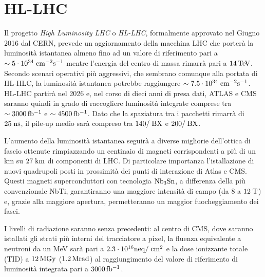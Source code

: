 \section{HL-LHC}
Il progetto {\em High Luminosity LHC} o {\em HL-LHC}, formalmente approvato nel Giugno 2016 dal CERN, prevede un aggiornamento della macchina LHC che porter\`a la luminosit\`a istantanea almeno fino ad un valore di riferimento pari a $\sim \nobreak 5\cdot10^{34}\rm \; cm^{-2}{\mathrm s}^{-1}$ mentre l'energia del centro di massa rimarr\`a pari a $14{\rm \, Te\kern-0.125em V}$. 
Secondo scenari operativi pi\`u aggressivi, che sembrano comunque alla portata di HL-HLC, la luminosit\`a istantanea potrebbe raggiungere $\sim \nobreak  7.5\cdot10^{34}\rm \; cm^{-2}{\mathrm s}^{-1}$. HL-LHC partir\`a nel 2026 e, nel corso di dieci anni di presa dati, ATLAS e CMS saranno quindi in grado di raccogliere luminosit\`a integrate comprese tra $\sim3000{\rm \, fb^{-1}}$ e $\sim4500{\rm \, fb^{-1}}$. Dato che la spaziatura tra i pacchetti rimarr\`a di $25\rm \; ns$, il pile-up medio sar\`a compreso tra $140/\rm \; BX$ e $200/\rm \; BX$.

L'aumento della luminosit\`a istantanea seguir\`a a diverse migliorie dell'ottica di fascio ottenute rimpiazzando un centinaio di magneti corrispondenti a pi\`u di un km su $27\rm \; km$ di componenti di LHC. Di particolare importanza l'istallazione di nuovi quadrupoli posti in prossimit\`a dei punti di interazione di Atlas e CMS. Questi magneti superconduttori con tecnologia ${\rm Nb_3Sn}$, a differenza della pi\`u convenzionale NbTi, garantiranno una maggiore intensit\`a di campo (da 8 a $12\rm \; T$) e, grazie alla maggiore apertura, permetteranno un maggior fuocheggiamento dei fasci. 

I livelli di radiazione saranno senza precedenti: al centro di CMS, dove saranno istallati gli strati pi\`u interni del tracciatore a pixel, la fluenza equivalente a neutroni da un MeV sar\`a pari a $2.3\cdot 10^{16} {\rm neq}/\rm \; cm^2$ e la dose ionizzante totale (TID) a $12{\rm \, MGy}$ ($1.2{\rm \, Mrad}$) al raggiungimento del valore di riferimento di luminosit\`a integrata pari a $3000{\rm \, fb^{-1}}$.

